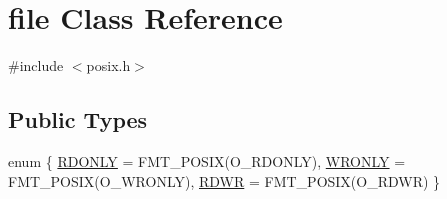 \hypertarget{classfile}{}\section{file Class Reference}
\label{classfile}


{\ttfamily \#include $<$posix.\+h$>$}

\subsection*{Public Types}
\begin{DoxyCompactItemize}
\item 
enum \{ \hyperlink{classfile_aa84b8a1d28ab2c03182796d9435e84c3aac58f1566e053cf5f8ee9dcb5f97b82b}{R\+D\+O\+N\+LY} = F\+M\+T\+\_\+\+P\+O\+S\+IX(O\+\_\+\+R\+D\+O\+N\+LY), 
\hyperlink{classfile_aa84b8a1d28ab2c03182796d9435e84c3ade40e8cbe66eb259ed5378c7d13b4f69}{W\+R\+O\+N\+LY} = F\+M\+T\+\_\+\+P\+O\+S\+IX(O\+\_\+\+W\+R\+O\+N\+LY), 
\hyperlink{classfile_aa84b8a1d28ab2c03182796d9435e84c3aafcab766b3f436a66049b850ef7efb5c}{R\+D\+WR} = F\+M\+T\+\_\+\+P\+O\+S\+IX(O\+\_\+\+R\+D\+WR)
 \}
\end{DoxyCompactItemize}
